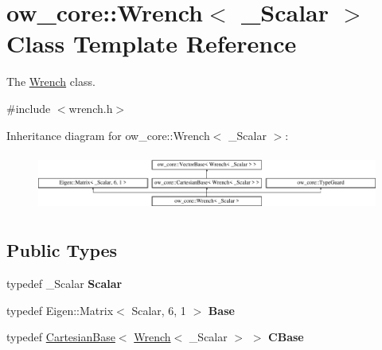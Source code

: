 \hypertarget{classow__core_1_1Wrench}{}\section{ow\+\_\+core\+:\+:Wrench$<$ \+\_\+\+Scalar $>$ Class Template Reference}
\label{classow__core_1_1Wrench}


The \hyperlink{classow__core_1_1Wrench}{Wrench} class.  




{\ttfamily \#include $<$wrench.\+h$>$}

Inheritance diagram for ow\+\_\+core\+:\+:Wrench$<$ \+\_\+\+Scalar $>$\+:\begin{figure}[H]
\begin{center}
\leavevmode
\includegraphics[height=1.911263cm]{dc/dd9/classow__core_1_1Wrench}
\end{center}
\end{figure}
\subsection*{Public Types}
\begin{DoxyCompactItemize}
\item 
typedef \+\_\+\+Scalar {\bfseries Scalar}\hypertarget{classow__core_1_1Wrench_af462e5302ef95be5f70d5a7889c994ca}{}\label{classow__core_1_1Wrench_af462e5302ef95be5f70d5a7889c994ca}

\item 
typedef Eigen\+::\+Matrix$<$ Scalar, 6, 1 $>$ {\bfseries Base}\hypertarget{classow__core_1_1Wrench_a493b8a5d84ade9788815b5967f67774a}{}\label{classow__core_1_1Wrench_a493b8a5d84ade9788815b5967f67774a}

\item 
typedef \hyperlink{classow__core_1_1CartesianBase}{Cartesian\+Base}$<$ \hyperlink{classow__core_1_1Wrench}{Wrench}$<$ \+\_\+\+Scalar $>$ $>$ {\bfseries C\+Base}\hypertarget{classow__core_1_1Wrench_ab9cc2b0689d6d51a5b24f890409fce8a}{}\label{classow__core_1_1Wrench_ab9cc2b0689d6d51a5b24f890409fce8a}

\end{DoxyCompactItemize}

